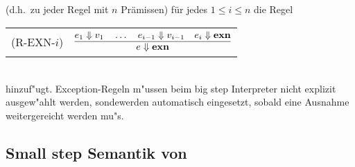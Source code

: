 (d.h.\ zu jeder Regel mit $n$ Pr\"amissen) f\"ur jedes $1 \le i \le n$ die Regel \\[3mm]
   \begin{tabular}{ll}
      \mbox{(R-EXN-$i$)} & $\regel{e_1 \eval v_1 \quad \ldots \quad e_{i-1} \eval v_{i-1} \quad e_i \eval \exn}
                                {e \eval \exn}$ \\[5mm]
   \end{tabular}\\[3mm]
hinzuf"ugt. Exception-Regeln m"ussen beim big step Interpreter nicht explizit ausgew"ahlt werden, sonde\mbox werden
automatisch eingesetzt, sobald eine Ausnahme weitergereicht werden mu"s.


\subsection{Small step Semantik von \LONE}

